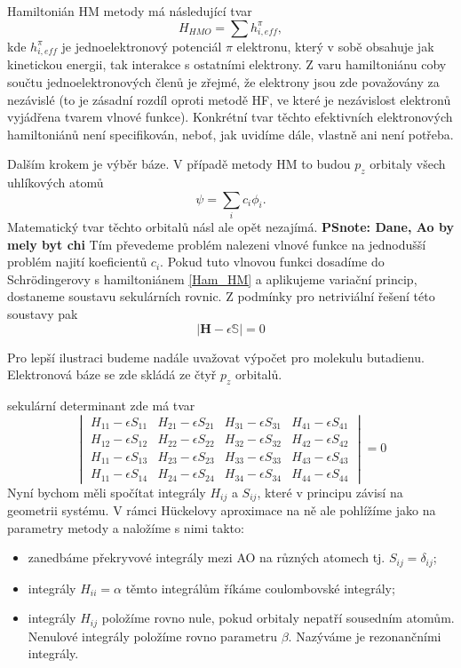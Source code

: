 Hamiltonián HM metody má následující tvar
\begin{equation}
H_{HMO}= \sum h_{i, eff}^\pi,
\label{rov:Ham_HM}
\end{equation}
kde $h_{i, eff}^\pi$ je jednoelektronový potenciál $\pi$ elektronu, který v sobě obsahuje jak kinetickou energii, tak interakce s ostatními elektrony.
Z varu hamiltoniánu coby součtu jednoelektronových členů je zřejmé, že elektrony jsou zde považovány za nezávislé (to je zásadní rozdíl oproti metodě HF, ve které je nezávislost elektronů vyjádřena  tvarem vlnové funkce). 
Konkrétní tvar těchto efektivních elektronových hamiltoniánů není specifikován, neboť, jak uvidíme dále, vlastně ani není potřeba. 

Dalším krokem je výběr báze. V případě metody HM to budou $p_z$ orbitaly všech uhlíkových atomů
\begin{equation}
\psi= \sum_i c_i \phi_i.
\label{rov:HM_MO}
\end{equation}
 Matematický tvar těchto orbitalů násl ale opět nezajímá. \textbf{PSnote: Dane, Ao by mely byt chi} Tím převedeme problém nalezeni vlnové funkce na jednodušší problém najití koeficientů $c_i$. Pokud tuto vlnovou funkci dosadíme do Schr\"odingerovy s hamiltoniánem \ref{Ham_HM} a aplikujeme variační princip, dostaneme soustavu sekulárních rovnic. Z podmínky pro netriviální řešení této soustavy pak 
\begin{equation}
|\mathbf{H}-\epsilon \mathbb{S}|=0
\label{rov:HM_det}
\end{equation}

Pro lepší ilustraci budeme nadále uvažovat výpočet pro molekulu butadienu.
Elektronová báze se zde skládá ze čtyř $p_z$ orbitalů.

sekulární determinant zde má tvar
\begin{equation}
\begin{vmatrix}
H_{11}-\epsilon S_{11} & H_{21}-\epsilon S_{21} & H_{31}-\epsilon S_{31} & H_{41}-\epsilon S_{41}  \\
H_{12}-\epsilon S_{12} & H_{22}-\epsilon S_{22} & H_{32}-\epsilon S_{32} & H_{42}-\epsilon S_{42}  \\
H_{11}-\epsilon S_{13} & H_{23}-\epsilon S_{23} & H_{33}-\epsilon S_{33} & H_{43}-\epsilon S_{43}  \\
H_{11}-\epsilon S_{14} & H_{24}-\epsilon S_{24} & H_{34}-\epsilon S_{34} & H_{44}-\epsilon S_{44}
\end{vmatrix}
= 0
\end{equation}
Nyní bychom měli spočítat integrály $H_{ij}$ a $S_{ij}$, které v principu závisí na geometrii systému.
V rámci H\"{u}ckelovy aproximace na ně ale pohlížíme jako na parametry metody
a naložíme s nimi takto:
\begin{itemize}
\item zanedbáme překryvové integrály mezi AO na různých atomech tj. $S_{ij}=\delta_{ij}$;
\item integrály $H_{ii}=\alpha$ těmto integrálům říkáme coulombovské integrály;
\item integrály $H_{ij}$ položíme rovno nule, pokud orbitaly nepatří sousedním atomům.
Nenulové integrály položíme rovno parametru $\beta$. Nazýváme je rezonančními integrály.
\end{itemize}

